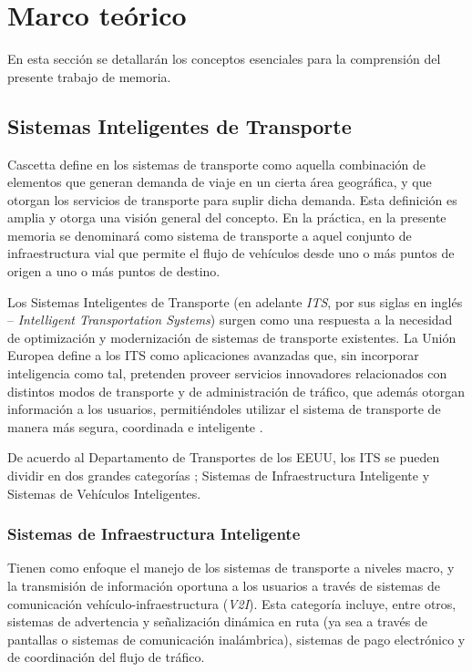 \section{Marco teórico}

En esta sección se detallarán los conceptos esenciales para la comprensión del presente trabajo de memoria.

\subsection{Sistemas Inteligentes de Transporte}

Cascetta define en \autocite{cascetta2013transportation} los sistemas de transporte como aquella combinación de elementos que generan demanda de viaje en un cierta área geográfica, y que otorgan los servicios de transporte para suplir dicha demanda. Esta definición es amplia y otorga una visión general del concepto. En la práctica, en la presente memoria se denominará como sistema de transporte a aquel conjunto de infraestructura vial que permite el flujo de vehículos desde uno o más puntos de origen a uno o más puntos de destino.

Los Sistemas Inteligentes de Transporte (en adelante \emph{ITS}, por sus siglas en inglés -- \textit{Intelligent Transportation Systems}) surgen como una respuesta a la necesidad de optimización y modernización de sistemas de transporte existentes. La Unión Europea define a los ITS como aplicaciones avanzadas que, sin incorporar inteligencia como tal, pretenden proveer servicios innovadores relacionados con distintos modos de transporte y de administración de tráfico, que además otorgan información a los usuarios, permitiéndoles utilizar el sistema de transporte de manera más segura, coordinada e inteligente \autocite{eudirective}. 

De acuerdo al Departamento de Transportes de los EEUU, los ITS se pueden dividir en dos grandes categorías \autocite{usdot}; Sistemas de Infraestructura Inteligente y Sistemas de Vehículos Inteligentes.

\subsubsection{Sistemas de Infraestructura Inteligente}

Tienen como enfoque el manejo de los sistemas de transporte a niveles macro, y la transmisión de información oportuna a los usuarios a través de sistemas de comunicación vehículo-infraestructura (\emph{V2I}). Esta categoría incluye, entre otros, sistemas de advertencia y señalización dinámica en ruta (ya sea a través de pantallas o sistemas de comunicación inalámbrica), sistemas de pago electrónico y de coordinación del flujo de tráfico.


